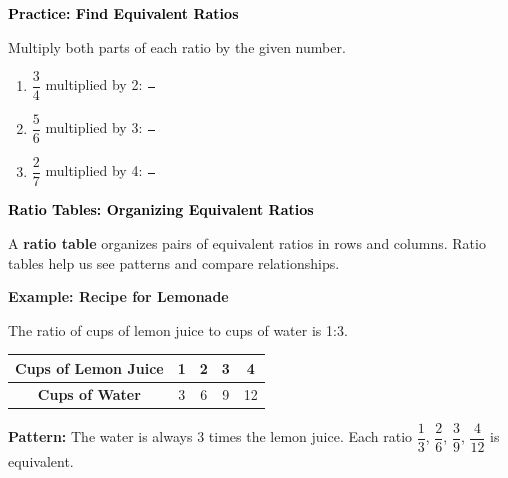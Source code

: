 \documentclass[12pt, letterpaper, fleqn]{article}
\begin{document}
\begin{tcolorbox}[colback=customteal!20]
\large\textcolor{black}{\textbf{Practice: Find Equivalent Ratios}}
\end{tcolorbox}

\noindent
Multiply both parts of each ratio by the given number.

\vspace{3mm}

\begin{enumerate}[itemsep=1.2cm, leftmargin=0.6cm]
\item $\dfrac{3}{4}$ multiplied by 2: $\dfrac{\phantom{0}}{\phantom{0}}$
\item $\dfrac{5}{6}$ multiplied by 3: $\dfrac{\phantom{0}}{\phantom{0}}$
\item $\dfrac{2}{7}$ multiplied by 4: $\dfrac{\phantom{0}}{\phantom{0}}$
\end{enumerate}

\newpage

\begin{tcolorbox}[colback=customteal!20]
\large\textcolor{black}{\textbf{Ratio Tables: Organizing Equivalent Ratios}}
\end{tcolorbox}

\noindent
A \textbf{ratio table} organizes pairs of equivalent ratios in rows and columns. Ratio tables help us see patterns and compare relationships.

\vspace{3mm}

\begin{tcolorbox}[colback=white, colframe=black!25, boxrule=0.6pt, arc=4mm, left=6mm, right=6mm, top=5mm, bottom=5mm]

\textbf{Example: Recipe for Lemonade}

\noindent
The ratio of cups of lemon juice to cups of water is 1:3.

\begin{center}
\begin{tabular}{|c|c|c|c|c|}
\hline
\textbf{Cups of Lemon Juice} & 1 & 2 & 3 & 4 \\
\hline
\textbf{Cups of Water} & 3 & 6 & 9 & 12 \\
\hline
\end{tabular}
\end{center}

\noindent
\textbf{Pattern:} The water is always 3 times the lemon juice. Each ratio $\dfrac{1}{3}$, $\dfrac{2}{6}$, $\dfrac{3}{9}$, $\dfrac{4}{12}$ is equivalent.

\end{tcolorbox}
\end{document}
